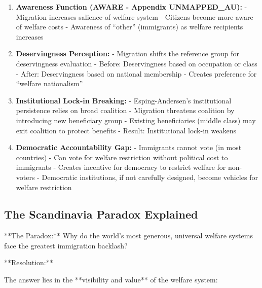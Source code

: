 \begin{enumerate}

\item \textbf{Awareness Function (AWARE - Appendix UNMAPPED_AU):}
   - Migration increases salience of welfare system
   - Citizens become more aware of welfare costs
   - Awareness of ``other'' (immigrants) as welfare recipients increases

\item \textbf{Deservingness Perception:}
   - Migration shifts the reference group for deservingness evaluation
   - Before: Deservingness based on occupation or class
   - After: Deservingness based on national membership
   - Creates preference for ``welfare nationalism''

\item \textbf{Institutional Lock-in Breaking:}
   - Esping-Andersen's institutional persistence relies on broad coalition
   - Migration threatens coalition by introducing new beneficiary group
   - Existing beneficiaries (middle class) may exit coalition to protect benefits
   - Result: Institutional lock-in weakens

\item \textbf{Democratic Accountability Gap:}
   - Immigrants cannot vote (in most countries)
   - Can vote for welfare restriction without political cost to immigrants
   - Creates incentive for democracy to restrict welfare for non-voters
   - Democratic institutions, if not carefully designed, become vehicles for welfare restriction

\end{enumerate}

\subsection{The Scandinavia Paradox Explained}

**The Paradox:** Why do the world's most generous, universal welfare systems face the greatest immigration backlash?

**Resolution:**

The answer lies in the **visibility and value** of the welfare system:

